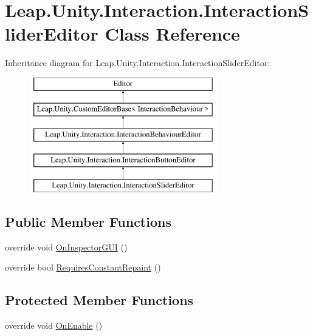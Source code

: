 \hypertarget{class_leap_1_1_unity_1_1_interaction_1_1_interaction_slider_editor}{}\section{Leap.\+Unity.\+Interaction.\+Interaction\+Slider\+Editor Class Reference}
\label{class_leap_1_1_unity_1_1_interaction_1_1_interaction_slider_editor}
Inheritance diagram for Leap.\+Unity.\+Interaction.\+Interaction\+Slider\+Editor\+:\begin{figure}[H]
\begin{center}
\leavevmode
\includegraphics[height=5.000000cm]{class_leap_1_1_unity_1_1_interaction_1_1_interaction_slider_editor}
\end{center}
\end{figure}
\subsection*{Public Member Functions}
\begin{DoxyCompactItemize}
\item 
override void \mbox{\hyperlink{class_leap_1_1_unity_1_1_interaction_1_1_interaction_slider_editor_aa282c9ba071bcf4e50eaac45570ab9d1}{On\+Inspector\+G\+UI}} ()
\item 
override bool \mbox{\hyperlink{class_leap_1_1_unity_1_1_interaction_1_1_interaction_slider_editor_a8f97738759c3027bfa79206c53496a84}{Requires\+Constant\+Repaint}} ()
\end{DoxyCompactItemize}
\subsection*{Protected Member Functions}
\begin{DoxyCompactItemize}
\item 
override void \mbox{\hyperlink{class_leap_1_1_unity_1_1_interaction_1_1_interaction_slider_editor_a01649ae644e16c97e44c6e54a40b8e30}{On\+Enable}} ()
\end{DoxyCompactItemize}
